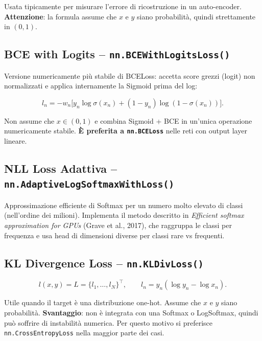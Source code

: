 Usata tipicamente per misurare l'errore di ricostruzione in un auto-encoder.
\textbf{Attenzione}: la formula assume che $x$ e $y$ siano probabilità, quindi
strettamente in $(0, 1)$.

\subsection{BCE with Logits -- \texttt{nn.BCEWithLogitsLoss()}}
\label{subsec:bce-logits}

Versione numericamente più stabile di BCELoss: accetta score grezzi (logit) non
normalizzati e applica internamente la Sigmoid prima del log:

\begin{equation}
  l_n = -w_n\bigl[y_n \log\sigma(x_n) + (1-y_n)\log(1-\sigma(x_n))\bigr].
\end{equation}

Non assume che $x \in (0,1)$ e combina Sigmoid + BCE in un'unica operazione
numericamente stabile. \textbf{È preferita a \texttt{nn.BCELoss}} nelle reti con
output layer lineare.

\subsection{NLL Loss Adattiva -- \texttt{nn.AdaptiveLogSoftmaxWithLoss()}}
\label{subsec:adaptive}

Approssimazione efficiente di Softmax per un numero molto elevato di classi
(nell'ordine dei milioni). Implementa il metodo descritto in
\textit{Efficient softmax approximation for GPUs} (Grave et al., 2017), che
raggruppa le classi per frequenza e usa head di dimensioni diverse per classi
rare vs frequenti.

\subsection{KL Divergence Loss -- \texttt{nn.KLDivLoss()}}
\label{subsec:kldiv}

\begin{equation}
  l(x, y) = L = \{l_1, \ldots, l_N\}^\top, \qquad
  l_n = y_n(\log y_n - \log x_n).
\end{equation}

Utile quando il target è una distribuzione one-hot. Assume che $x$ e $y$ siano
probabilità. \textbf{Svantaggio}: non è integrata con una Softmax o LogSoftmax,
quindi può soffrire di instabilità numerica. Per questo motivo si preferisce
\texttt{nn.CrossEntropyLoss} nella maggior parte dei casi.

